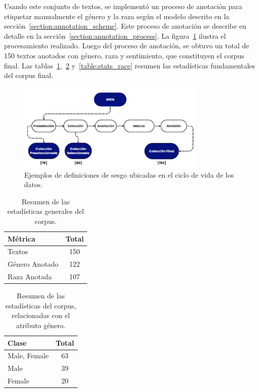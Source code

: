 Usando este conjunto de textos, se implement\'o un proceso de anotaci\'on para etiquetar manualmente el g\'enero y la raza seg\'un 
el modelo descrito en la secci\'on~\ref{section:annotation_scheme}. Este proceso de anotaci\'on se describe en detalle en la 
secci\'on~\ref{section:annotation_process}. La figura~\ref{fig:ann_proc} ilustra el procesamiento realizado.
Luego del proceso de anotaci\'on, se obtuvo un total de 150 textos anotados con g\'enero, raza y sentimiento, que constituyen el 
corpus final. Las tablas~\ref{table:stats},~\ref{table:stats_gen} y~\ref{table:stats_race}  resumen las estad\'isticas fundamentales 
del corpus final.

\begin{figure}[htpb]
    \begin{center}
        \includegraphics[width=0.8\textwidth]{Graphics/annotation_proc.png}
    \end{center}
    \caption{Ejemplos de definiciones de sesgo ubicadas en el ciclo de vida de los datos.}
    \label{fig:ann_proc}
\end{figure}

\begin{table}[htpb]
    \centering
        \begin{tabular}{lc}
        \toprule
        \textbf{M\'etrica} & \textbf{Total} \\
        \midrule
                    Textos & 150 \\
          G\'enero Anotado & 122 \\
              Raza Anotada & 107 \\

        \bottomrule
        \end{tabular}
    \caption{Resumen de las estad\'isticas generales del corpus.}
    \label{table:stats}
\end{table}

\begin{table}[htpb]
    \centering
        \begin{tabular}{lc}
        \toprule
          \textbf{Clase} & \textbf{Total} \\
        \midrule
            Male, Female & 63 \\
                    Male & 39 \\
                  Female & 20 \\

        \bottomrule
        \end{tabular}
    \caption{Resumen de las estad\'isticas del corpus, relacionadas con el atributo g\'enero.}
    \label{table:stats_gen}
\end{table}

